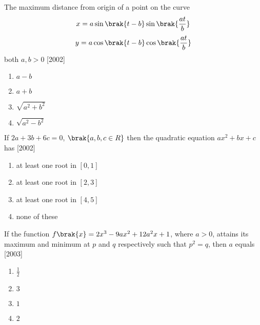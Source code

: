 \iffalse
  \title{APPLICATIONS OF DERIVATIVES}
  \author{HARSHILL RATHAN}
  \section{mcq-single}
\fi

    \item The maximum distance from origin of a point on the curve \begin{align*}
    x = a \sin\brak{t-b} \sin\brak{\frac{at}{b}}
\end{align*}
\begin{align*}
     y = a \cos\brak{t-b} \cos\brak{\frac{at}{b}}
\end{align*} 
both $a, b > 0$ \hfill{[2002]}
\begin{multicols}{2}
\begin{enumerate}
    \item $a-b$
    \item $a+b$
    \item $\sqrt{a^2+b^2}$
    \item $\sqrt{a^2-b^2}$ 
\end{enumerate}
\end{multicols}
\item If $2a+3b+6c=0$, $\brak{a,b,c \in R}$ then the quadratic equation $ax^2+bx+c$ has \hfill{[2002]}
\begin{multicols}{2}
\begin{enumerate}
    \item at least one root in $[0,1]$
    \item at  least one root in $[2,3]$
    \item at least one root in $[4,5]$
    \item none of these \\
\end{enumerate}
\end{multicols}
\item If the function $f\brak{x}=2x^3-9ax^2+12a^2x+1$, where $a>0$, attains its maximum and minimum at $p$ and $q$ respectively such that $p
    ^2=q$, then $a$ equals  \hfill{[2003]}
\begin{multicols}{2}
\begin{enumerate}
       \item $\frac{1}{2}$
       \item $3$
       \item $1$
       \item $2$
\end{enumerate}
\end{multicols}
